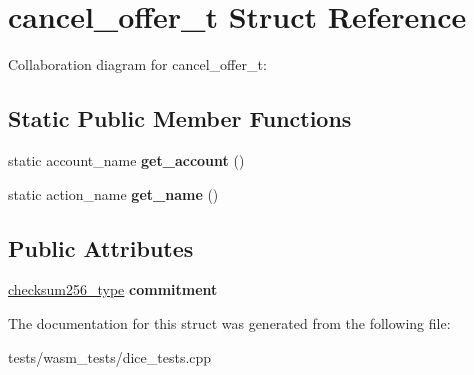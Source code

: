 \hypertarget{structcancel__offer__t}{}\section{cancel\+\_\+offer\+\_\+t Struct Reference}
\label{structcancel__offer__t}


Collaboration diagram for cancel\+\_\+offer\+\_\+t\+:
\subsection*{Static Public Member Functions}
\begin{DoxyCompactItemize}
\item 
\mbox{\label{structcancel__offer__t_ab107970b67c33a76b1a526ab40daf49f}} 
static account\+\_\+name {\bfseries get\+\_\+account} ()
\item 
\mbox{\label{structcancel__offer__t_afa2b213c1fe8636f3b81e2ae968f1726}} 
static action\+\_\+name {\bfseries get\+\_\+name} ()
\end{DoxyCompactItemize}
\subsection*{Public Attributes}
\begin{DoxyCompactItemize}
\item 
\mbox{\label{structcancel__offer__t_a86a51ef45588221a5a512ca31799a2c2}} 
\mbox{\hyperlink{classfc_1_1sha256}{checksum256\+\_\+type}} {\bfseries commitment}
\end{DoxyCompactItemize}


The documentation for this struct was generated from the following file\+:\begin{DoxyCompactItemize}
\item 
tests/wasm\+\_\+tests/dice\+\_\+tests.\+cpp\end{DoxyCompactItemize}
